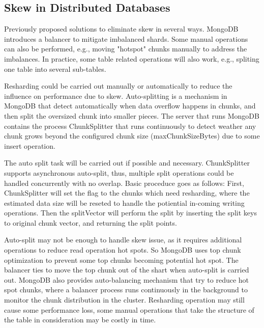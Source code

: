 \documentclass[a4paper,10pt,twoside]{article}
\begin{document}
\subsection{Skew in Distributed Databases}

Previously proposed solutions to eliminate skew in several ways.
MongoDB introduces a balancer to mitigate imbalanced shards\cite{MongoDB_balancing1}.
Some manual operations can also be performed, e.g., moving "hotspot" chunks manually to address the imbalances. 
In practice, some table related operations will also work, e.g., spliting one table into several sub-tables.
\par
Resharding could be carried out manually or automatically to reduce the influence on performance due to skew.
Auto-splitting is a mechanism in MongoDB\cite{MongoDB_sharding1} that detect automatically when data overflow happens in chunks, 
and then split the oversized chunk into smaller pieces.
The server that runs MongoDB contains the process ChunkSplitter that runs continuously to detect weather any chunk grows beyond the configured chunk size (maxChunkSizeBytes) due to some insert operation.
\par
The auto split task will be carried out if possible and necessary. ChunkSplitter supports asynchronous auto-split, thus, 
multiple split operations could be handled concurrently with no overlap. 
Basic proceduce goes as follows: 
First, ChunkSplitter will set the flag to the chunks which need resharding, where the estimated data size will be reseted to handle the potiential in-coming writing operations.
Then the splitVector will perform the split by inserting the split keys to original chunk vector, and returning the split points.
\par
Auto-split may not be enough to handle skew issue, as it requires additional operations to reduce read operation hot spots.
So MongoDB uses top chunk optimization to prevent some top chunks becoming potential hot spot.
The balancer ties to move the top chunk out of the shart when auto-split is carried out.
MongoDB also provides auto-balancing mechanism that try to reduce hot spot chunks, where a balancer process runs continuously in the background to monitor the chunk distribution in the cluster.
Resharding operation may still cause some performance loss, some manual operations that take the structure of the table in consideration may be costly in time.
\end{document}

